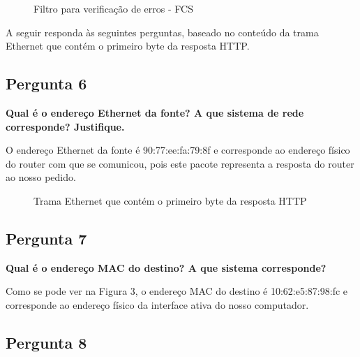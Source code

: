 \documentclass[11pt]{article}
\begin{document}
\begin{figure}[hbt!]
    \centering
    \caption{Filtro para verificação de erros - FCS}
\end{figure}

\vspace{0.5cm}

A seguir responda às seguintes perguntas, baseado no conteúdo da trama Ethernet que contém o primeiro byte da resposta HTTP.

\vspace{0.5cm}

\subsection{Pergunta 6}

\textbf{Qual é o endereço Ethernet da fonte? A que sistema de rede corresponde? Justifique.}

O endereço Ethernet da fonte é 90:77:ee:fa:79:8f e corresponde ao endereço físico do router com que se comunicou, pois este pacote representa a resposta do router ao nosso pedido.

\begin{figure}[hbt!]
    \centering
    \caption{Trama Ethernet que contém o primeiro byte da resposta HTTP}
\end{figure}

\subsection{Pergunta 7}

\textbf{Qual é o endereço MAC do destino? A que sistema corresponde?}

Como se pode ver na Figura 3, o endereço MAC do destino é 10:62:e5:87:98:fc e corresponde ao endereço físico da interface ativa do nosso computador.
\clearpage
\subsection{Pergunta 8}
\end{document}
